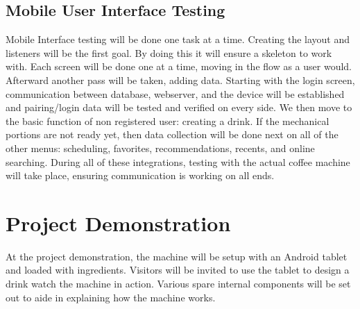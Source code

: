 \documentclass[conference]{IEEEtran}
\begin{document}
\subsection{Mobile User Interface Testing}
Mobile Interface testing will be done one task at a time. Creating the layout and listeners will be the first
 goal. By doing this it will ensure a skeleton to work with. Each screen will be done one at a time,
moving in the flow as a user would. Afterward another pass will be taken, adding data. Starting with the
 login screen, communication between database, webserver, and the device will be established and
  pairing/login data will be tested and verified on every side. We then move to the basic function of non
  registered user: creating a drink. If the mechanical portions are not ready yet, then data collection will
   be done next on all of the other menus: scheduling, favorites, recommendations, recents, and online
    searching. During all of these integrations, testing with the actual coffee machine will take place, 
    ensuring communication is working on all ends. 

\section{Project Demonstration}
At the project demonstration, the machine will be setup with an Android tablet and loaded with ingredients.
Visitors will be invited to use the tablet to design a drink watch the machine
in action. Various spare internal components will be set out to aide in explaining how the machine works.

% 
% 

{}

\end{document}
